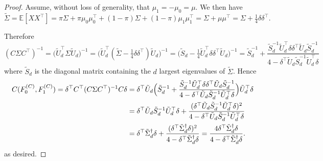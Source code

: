 \documentclass[11pt]{extarticle}
\begin{document}
\begin{proof}
Assume, without loss of generality, that $\mu_1 = -\mu_0 = \mu$. We then have
$$\tilde{\Sigma} = \mathbb{E}[X X^{\top}] = \pi \Sigma + \pi \mu_0 \mu_0^{\top} + (1 - \pi) \Sigma + (1 - \pi) \mu_1 \mu_1^{\top} = \Sigma + \mu \mu^{\top} = \Sigma + \tfrac{1}{4} \delta \delta^{\top}. $$

Therefore
$$ (C \Sigma C^{\top})^{-1} = \bigl(\tilde{U}_{d}^{\top} \Sigma \tilde{U}_d \bigr)^{-1} = \bigl( \tilde{U}_d^{\top} (\tilde{\Sigma} - \tfrac{1}{4} \delta \delta^{\top}) \tilde{U}_d\bigr)^{-1} = \bigl(\tilde{S}_d - \tfrac{1}{4} \tilde{U}_d^{\top} \delta \delta^{\top} \tilde{U}_d \bigr)^{-1} = \tilde{S}_d^{-1} + \frac{\tilde{S}_d^{-1} \tilde{U}_d^{\top} \delta \delta^{\top} \tilde{U}_d \tilde{S}_d^{-1}}{4 - \delta^{\top} \tilde{U}_d \tilde{S}_d^{-1} \tilde{U}_d^{\top} \delta} $$
where $\tilde{S}_d$ is the diagonal matrix containing the $d$ largest eigenvalues of $\tilde{\Sigma}$. Hence
\begin{equation}
\begin{split}
C(F_0^{(C)}, F_1^{(C)}) = \delta^{\top} C^{\top} (C \Sigma C^{\top})^{-1} C \delta & = \delta^{\top} \tilde{U}_d \Bigl(\tilde{S}_d^{-1} + \frac{\tilde{S}_d^{-1} \tilde{U}_d^{\top} \delta \delta^{\top} \tilde{U}_d \tilde{S}_d^{-1}}{4 - \delta^{\top} \tilde{U}_d \tilde{S}_d^{-1} \tilde{U}_d^{\top} \delta} \Bigr) \tilde{U}_d^{\top} \delta \\ &= \delta^{\top} \tilde{U}_d \tilde{S}_d^{-1} \tilde{U}_d^{\top} \delta + \frac{(\delta^{\top} \tilde{U}_d \tilde{S}_d^{-1} \tilde{U}_d^{\top} \delta)^{2}}{4 - \delta^{\top} \tilde{U}_d \tilde{S}_d^{-1} \tilde{U}_d^{\top} \delta} \\
&= \delta^{\top} \tilde{\Sigma}_d^{\dagger} \delta + \frac{(\delta^{\top} \tilde{\Sigma}_d^{\dagger} \delta)^2}{4 - \delta^{\top} \tilde{\Sigma}_d^{\dagger} \delta} = \frac{4 \delta^{\top} \tilde{\Sigma}_d^{\dagger} \delta}{4 - \delta^{\top} \tilde{\Sigma}_d^{\dagger} \delta}.
\end{split}
\end{equation}
as desired.
\end{proof}
\end{document}
